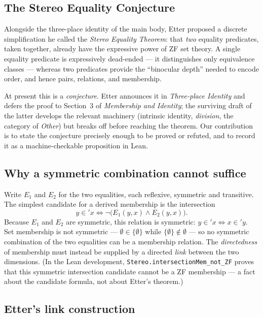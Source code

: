 \documentclass{ws-rv9x6}
\theoremstyle{remark}
\begin{document}
\clearpage
\begin{appendices}
\section{The Stereo Equality Conjecture}
\label{app:stereo}

Alongside the three-place identity of the main body, Etter proposed a discrete simplification he called the \emph{Stereo Equality Theorem}: that \emph{two} equality predicates, taken together, already have the expressive power of ZF set theory. A single equality predicate is expressively dead-ended --- it distinguishes only equivalence classes --- whereas two predicates provide the ``binocular depth'' needed to encode order, and hence pairs, relations, and membership.

At present this is a \emph{conjecture}. Etter announces it in \emph{Three-place Identity}\cite{etter_3pl} and defers the proof to Section~3 of \emph{Membership and Identity}\cite{etter_mem}; the surviving draft of the latter develops the relevant machinery (intrinsic identity, \emph{division}, the category of \emph{Other}) but breaks off before reaching the theorem. Our contribution is to state the conjecture precisely enough to be proved or refuted, and to record it as a machine-checkable proposition in Lean.

\subsection{Why a symmetric combination cannot suffice}

Write $E_1$ and $E_2$ for the two equalities, each reflexive, symmetric and transitive. The simplest candidate for a derived membership is the intersection
\[
y \in' x \iff \neg\bigl(E_1(y, x) \land E_2(y, x)\bigr).
\]
Because $E_1$ and $E_2$ are symmetric, this relation is symmetric: $y \in' x \iff x \in' y$. Set membership is not symmetric --- $\emptyset \in \{\emptyset\}$ while $\{\emptyset\} \notin \emptyset$ --- so no symmetric combination of the two equalities can be a membership relation. The \emph{directedness} of membership must instead be supplied by a directed \emph{link} between the two dimensions. (In the Lean development, \texttt{Stereo.intersectionMem\_not\_ZF} proves that this symmetric intersection candidate cannot be a ZF membership --- a fact about the candidate formula, not about Etter's theorem.)

\subsection{Etter's link construction}


\end{appendices}
\end{document}
